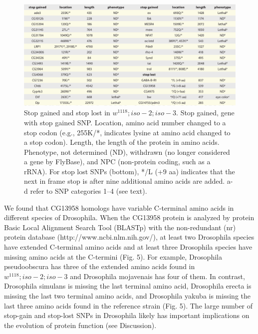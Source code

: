 \begin{figure}
    \centering
    \includegraphics[width=14cm]{snpeff_table7.png}
    \caption{Stop gained and stop lost in $w^{1118} ; iso-2; iso-3$. Stop gained, gene with stop gained SNP. Location, amino acid number changed to a stop codon (e.g., 255K/*, indicates lysine at amino acid changed to a stop codon). Length, the length of the protein in amino acids. Phenotype, not determined (ND), withdrawn (no longer considered a gene by FlyBase), and NPC (non-protein coding, such as a rRNA). For stop lost SNPs (bottom), */L (+9 aa) indicates that the next in frame stop is after nine additional amino acids are added. a-d refer to SNP categories 1–4 (see text).}
    \label{fig:snpeffTab3}
\end{figure}

We found that CG13958 homologs have variable C-terminal amino acids in different species of Drosophila. When the CG13958 protein is analyzed by protein Basic Local Alignment Search Tool (BLASTp) with the non-redundant (nr) protein database (http://www.ncbi.nlm.nih.gov/), at least two Drosophila species have extended C-terminal amino acids and at least three Drosophila species have missing amino acids at the C-termini (Fig. 5). For example, Drosophila pseudoobscura has three of the extended amino acids found in $w^{1118} ; iso-2; iso-3$ and Drosophila mojavenais has four of them. In contrast, Drosophila simulans is missing the last terminal amino acid, Drosophila erecta is missing the last two terminal amino acids, and Drosophila yakuba is missing the last three amino acids found in the reference strain (Fig. 5). The large number of stop-gain and stop-lost SNPs in Drosophila likely has important implications on the evolution of protein function (see Discussion).

